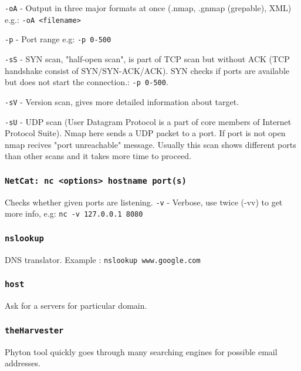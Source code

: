 \documentclass{article}[12pt]
\begin{document}
\texttt{-oA} - Output in three major formats at once (.nmap, .gnmap (grepable), XML) e.g.: \texttt{-oA <filename>}
\newline

\texttt{-p} - Port range e.g: \texttt{-p 0-500}
\newline

\texttt{-sS} - SYN scan, "half-open scan", is part of TCP scan but without ACK (TCP handshake consist of SYN/SYN-ACK/ACK).
SYN checks if ports are available but does not start the connection.: \texttt{-p 0-500}.
\newline

\texttt{-sV} - Version scan, gives more detailed information about target.
\newline

\texttt{-sU} - UDP scan (User Datagram Protocol is a part of core members of Internet Protocol Suite).
Nmap here sends a UDP packet to a port.
If port is not open nmap recives "port unreachable" message.
Usually this scan shows different ports than other scans and it takes more time to proceed.
\newline



\subsubsection{\texttt{NetCat: nc <options> hostname port(s)}}
Checks whether given ports are listening.
\texttt{-v} - Verbose, use twice (-vv) to get more info, e.g: \texttt{nc -v 127.0.0.1  8080}

\subsubsection{\texttt{nslookup}}
DNS translator. Example : \texttt{nslookup www.google.com}

\subsubsection{\texttt{host}}
Ask for a servers for particular domain.

\subsubsection{\texttt{theHarvester}}
Phyton tool quickly goes through many searching engines for possible email addresses.
\newline
\end{document}
